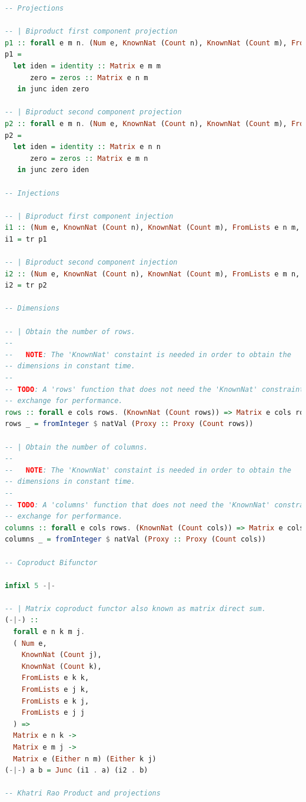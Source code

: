 \documentclass[
  oneside,
  11pt, a4paper,
  footinclude=true,
  headinclude=true,
  cleardoublepage=empty
]{scrbook}
\theoremstyle{definition}
\theoremstyle{definition}
\begin{document}
\begin{lstlisting}[language=Haskell, caption={Type safe inductive matrix library},captionpos=b]
-- Projections

-- | Biproduct first component projection
p1 :: forall e m n. (Num e, KnownNat (Count n), KnownNat (Count m), FromLists e n m, FromLists e m m) => Matrix e (Either m n) m
p1 =
  let iden = identity :: Matrix e m m
      zero = zeros :: Matrix e n m
   in junc iden zero

-- | Biproduct second component projection
p2 :: forall e m n. (Num e, KnownNat (Count n), KnownNat (Count m), FromLists e m n, FromLists e n n) => Matrix e (Either m n) n
p2 =
  let iden = identity :: Matrix e n n
      zero = zeros :: Matrix e m n
   in junc zero iden

-- Injections

-- | Biproduct first component injection
i1 :: (Num e, KnownNat (Count n), KnownNat (Count m), FromLists e n m, FromLists e m m) => Matrix e m (Either m n)
i1 = tr p1

-- | Biproduct second component injection
i2 :: (Num e, KnownNat (Count n), KnownNat (Count m), FromLists e m n, FromLists e n n) => Matrix e n (Either m n)
i2 = tr p2

-- Dimensions

-- | Obtain the number of rows.
--
--   NOTE: The 'KnownNat' constaint is needed in order to obtain the
-- dimensions in constant time.
--
-- TODO: A 'rows' function that does not need the 'KnownNat' constraint in
-- exchange for performance.
rows :: forall e cols rows. (KnownNat (Count rows)) => Matrix e cols rows -> Int
rows _ = fromInteger $ natVal (Proxy :: Proxy (Count rows))

-- | Obtain the number of columns.
-- 
--   NOTE: The 'KnownNat' constaint is needed in order to obtain the
-- dimensions in constant time.
--
-- TODO: A 'columns' function that does not need the 'KnownNat' constraint in
-- exchange for performance.
columns :: forall e cols rows. (KnownNat (Count cols)) => Matrix e cols rows -> Int
columns _ = fromInteger $ natVal (Proxy :: Proxy (Count cols))

-- Coproduct Bifunctor

infixl 5 -|-

-- | Matrix coproduct functor also known as matrix direct sum.
(-|-) ::
  forall e n k m j.
  ( Num e,
    KnownNat (Count j),
    KnownNat (Count k),
    FromLists e k k,
    FromLists e j k,
    FromLists e k j,
    FromLists e j j
  ) =>
  Matrix e n k ->
  Matrix e m j ->
  Matrix e (Either n m) (Either k j)
(-|-) a b = Junc (i1 . a) (i2 . b)

-- Khatri Rao Product and projections


\end{lstlisting}
\end{document}

